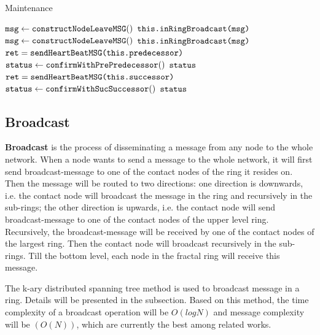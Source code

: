 \begin{algorithm}
	\caption{Maintenance}\label{euclid}
	\begin{algorithmic}[1]
		\State $\texttt{msg} \gets \texttt{constructNodeLeaveMSG}()$
		\State $\texttt{this.inRingBroadcast(msg)}$
		\EndIf
		\State $\texttt{msg} \gets \texttt{constructNodeLeaveMSG}()$
		\State $\texttt{this.inRingBroadcast(msg)}$
		\EndIf
		\EndFunction
		\\
		\State $\texttt{ret} = \texttt{sendHeartBeatMSG(this.predecessor)}$
		\State $\texttt{status} \gets \texttt{confirmWithPrePredecessor}()$
		\State \Return $\texttt{status}$
		\EndIf
		\EndFunction
		\\
		\State $\texttt{ret} = \texttt{sendHeartBeatMSG(this.successor)}$
		\State $\texttt{status} \gets \texttt{confirmWithSucSuccessor}()$
		\State \Return $\texttt{status}$
		\EndIf
		\EndFunction
	\end{algorithmic}
\end{algorithm}

\subsection{Broadcast} \label{broadcast}

\textbf{Broadcast} is the process of disseminating a message from any node to the whole network. When a node wants to send a message to the whole network, it will first send broadcast-message to one of the contact nodes of the ring it resides on. Then the message will be routed to two directions: one direction is downwards, i.e. the contact node will broadcast the message in the ring and recursively in the sub-rings; the other direction is upwards, i.e. the contact node will send broadcast-message to one of the contact nodes of the upper level ring. Recursively, the broadcast-message will be received by one of the contact nodes of the largest ring. Then the contact node will broadcast recursively in the sub-rings. Till the bottom level, each node in the fractal ring will receive this message.

The k-ary distributed spanning tree method \cite{el2003efficient} is used to broadcast message in a ring. Details will be presented in the subsection. Based on this method, the time complexity of a broadcast operation will be $O(logN)$ and message complexity will be $(O(N))$, which are currently the best among related works.

